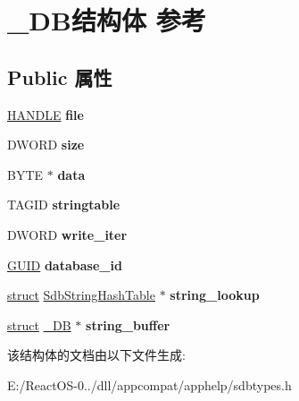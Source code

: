 \hypertarget{struct___d_b}{}\section{\+\_\+\+D\+B结构体 参考}
\label{struct___d_b}
\subsection*{Public 属性}
\begin{DoxyCompactItemize}
\item 
\mbox{\label{struct___d_b_a1ea5ebfec5f33c5da040dc3634b78a3c}} 
\hyperlink{interfacevoid}{H\+A\+N\+D\+LE} {\bfseries file}
\item 
\mbox{\label{struct___d_b_af8e8335dd7883a9cb342d12d942d0bfd}} 
D\+W\+O\+RD {\bfseries size}
\item 
\mbox{\label{struct___d_b_a804915120ab3e3bc7562779d6a7e0b92}} 
B\+Y\+TE $\ast$ {\bfseries data}
\item 
\mbox{\label{struct___d_b_aa0d3d197479e8f5121fce3912d2ebdc3}} 
T\+A\+G\+ID {\bfseries stringtable}
\item 
\mbox{\label{struct___d_b_a7708498882be6b020b75bb0cec778034}} 
D\+W\+O\+RD {\bfseries write\+\_\+iter}
\item 
\mbox{\label{struct___d_b_a5d4199109c97d3fb42dfddd94233d4cf}} 
\hyperlink{interface_g_u_i_d}{G\+U\+ID} {\bfseries database\+\_\+id}
\item 
\mbox{\label{struct___d_b_aa6894539a7da7e95edf29f8de2050a41}} 
\hyperlink{interfacestruct}{struct} \hyperlink{struct_sdb_string_hash_table}{Sdb\+String\+Hash\+Table} $\ast$ {\bfseries string\+\_\+lookup}
\item 
\mbox{\label{struct___d_b_a6faba030ff6581c0ed6869ce95800630}} 
\hyperlink{interfacestruct}{struct} \hyperlink{struct___d_b}{\+\_\+\+DB} $\ast$ {\bfseries string\+\_\+buffer}
\end{DoxyCompactItemize}


该结构体的文档由以下文件生成\+:\begin{DoxyCompactItemize}
\item 
E\+:/\+React\+O\+S-\/0../dll/appcompat/apphelp/sdbtypes.\+h\end{DoxyCompactItemize}
